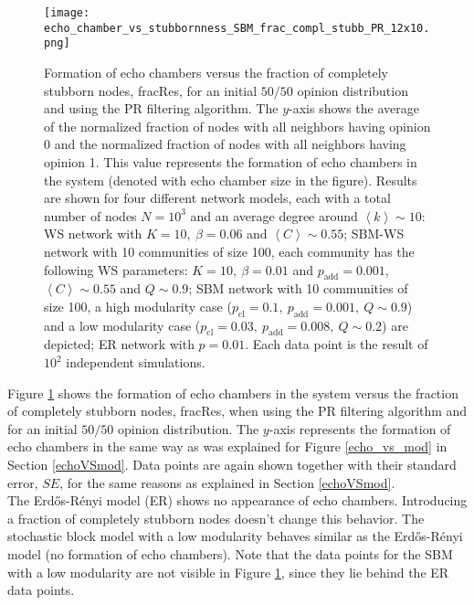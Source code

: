 \documentclass[11 pt , letterpaper , twoside , openright]{book}
\begin{document}
\begin{figure}[H]
	\texttt{[image: echo\_chamber\_vs\_stubbornness\_SBM\_frac\_compl\_stubb\_PR\_12x10.png]}
	\captionsetup{format=plain}
	\caption[Formation of echo chambers versus fraction of completely stubborn nodes for the PR filtering algorithm and an initial $50/50$ opinion distribution]{Formation of echo chambers versus the fraction of completely stubborn nodes, fracRes, for an initial $50/50$ opinion distribution and using the PR filtering algorithm. The $y$-axis shows the average of the normalized fraction of nodes with all neighbors having opinion 0 and the normalized fraction of nodes with all neighbors having opinion 1. This value represents the formation of echo chambers in the system (denoted with echo chamber size in the figure). Results are shown for four different network models, each with a total number of nodes $N=10^3$ and an average degree around $\left<k\right> \sim 10$: WS network with $K =10,\ \beta = 0.06$ and $\left<C\right> \sim 0.55$; SBM-WS network with 10 communities of size 100, each community has the following WS parameters: $K = 10,\ \beta = 0.01$ and $p_{\text{add}} = 0.001$, $\left<C\right> \sim 0.55$ and $Q \sim 0.9$; SBM network with 10 communities of size 100, a high modularity case ($p_{\text{cl}} = 0.1,\ p_{\text{add}} = 0.001,\ Q \sim 0.9$) and a low modularity case ($p_{\text{cl}} = 0.03,\ p_{\text{add}} = 0.008,\ Q \sim 0.2$) are depicted; ER network with $p= 0.01$. Each data point is the result of $10^2$ independent simulations.}
\label{echo_vs_frac_complStubb}
\end{figure}
\noindent
Figure \ref{echo_vs_frac_complStubb} shows the formation of echo chambers in the system versus the fraction of completely stubborn nodes, fracRes, when using the PR filtering algorithm and for an initial $50/50$ opinion distribution. The $y$-axis represents the formation of echo chambers in the same way as was explained for Figure \ref{echo_vs_mod} in Section \ref{echoVSmod}. Data points are again shown together with their standard error, $SE$, for the same reasons as explained in Section \ref{echoVSmod}.\\
The Erd\H{o}s-R\'{e}nyi model (ER) shows no appearance of echo chambers. Introducing a fraction of completely stubborn nodes doesn't change this behavior. The stochastic block model with a low modularity behaves similar as the Erd\H{o}s-R\'{e}nyi model (no formation of echo chambers). Note that the data points for the SBM with a low modularity are not visible in Figure \ref{echo_vs_frac_complStubb}, since they lie behind the ER data points.\\
\end{document}
